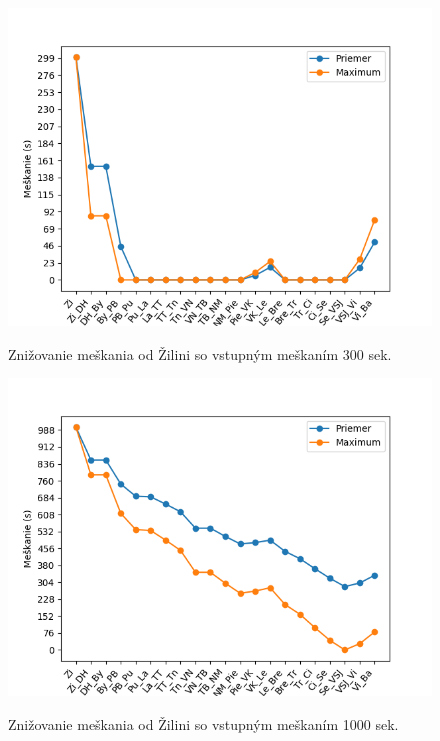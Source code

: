 \documentclass[11pt,a4paper]{article}
\begin{document}
\begin{figure}[H]
    \begin{center}
    \scalebox{0.8}
    {
        \includegraphics{Figure_4-0.png}
    }
    \caption{Znižovanie meškania od Žilini so vstupným meškaním 300 sek.}
    \label{pic:GRAF4}
    \end{center}
\end{figure}

\begin{figure}[H]
    \begin{center}
    \scalebox{0.8}
    {
        \includegraphics{Figure_4-1.png}
    }
    \caption{Znižovanie meškania od Žilini so vstupným meškaním 1000 sek.}
    \label{pic:GRAF5}
    \end{center}
\end{figure}
\end{document}
